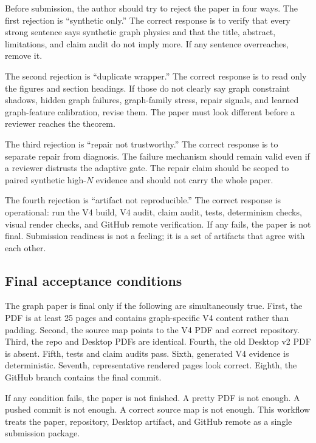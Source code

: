 \documentclass{article}
\begin{document}
Before submission, the author should try to reject the paper in four ways.  The
first rejection is ``synthetic only.''  The correct response is to verify that
every strong sentence says synthetic graph physics and that the title, abstract,
limitations, and claim audit do not imply more.  If any sentence overreaches,
remove it.

The second rejection is ``duplicate wrapper.''  The correct response is to read
only the figures and section headings.  If those do not clearly say graph
constraint shadows, hidden graph failures, graph-family stress, repair signals,
and learned graph-feature calibration, revise them.  The paper must look
different before a reviewer reaches the theorem.

The third rejection is ``repair not trustworthy.''  The correct response is to
separate repair from diagnosis.  The failure mechanism should remain valid even
if a reviewer distrusts the adaptive gate.  The repair claim should be scoped to
paired synthetic high-\(N\) evidence and should not carry the whole paper.

The fourth rejection is ``artifact not reproducible.''  The correct response is
operational: run the V4 build, V4 audit, claim audit, tests, determinism checks,
visual render checks, and GitHub remote verification.  If any fails, the paper
is not final.  Submission readiness is not a feeling; it is a set of artifacts
that agree with each other.

\subsection{Final acceptance conditions}

The graph paper is final only if the following are simultaneously true.  First,
the PDF is at least 25 pages and contains graph-specific V4 content rather than
padding.  Second, the source map points to the V4 PDF and correct repository.
Third, the repo and Desktop PDFs are identical.  Fourth, the old Desktop v2 PDF
is absent.  Fifth, tests and claim audits pass.  Sixth, generated V4 evidence is
deterministic.  Seventh, representative rendered pages look correct.  Eighth,
the GitHub branch contains the final commit.

If any condition fails, the paper is not finished.  A pretty PDF is not enough.
A pushed commit is not enough.  A correct source map is not enough.  This
workflow treats the paper, repository, Desktop artifact, and GitHub remote as a
single submission package.
\end{document}

